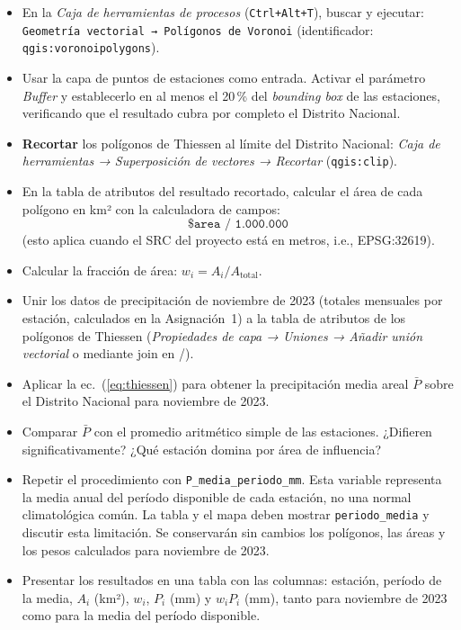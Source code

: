 \documentclass[11pt]{article}
\begin{document}
\begin{itemize}
  \item En la \emph{Caja de herramientas de procesos} (\texttt{Ctrl+Alt+T}),
    buscar y ejecutar:
    \texttt{Geometría vectorial → Polígonos de Voronoi}
    (identificador: \texttt{qgis:voronoipolygons}).

  \item Usar la capa de puntos de estaciones como entrada.
    Activar el parámetro \emph{Buffer} y establecerlo en al menos el
    20\,\% del \emph{bounding box} de las estaciones, verificando que el resultado
    cubra por completo el Distrito Nacional.

  \item \textbf{Recortar} los polígonos de Thiessen al límite del Distrito
    Nacional: \emph{Caja de herramientas → Superposición de vectores →
    Recortar} (\texttt{qgis:clip}).

  \item En la tabla de atributos del resultado recortado, calcular el área
    de cada polígono en km² con la calculadora de campos:
    \[
      \texttt{\$area / 1.000.000}
    \]
    (esto aplica cuando el SRC del proyecto está en metros, i.e., EPSG:32619).

  \item Calcular la fracción de área: $w_i = A_i / A_{\text{total}}$.
\end{itemize}


\begin{itemize}
  \item Unir los datos de precipitación de noviembre de 2023
    (totales mensuales por estación, calculados en la Asignación~1)
    a la tabla de atributos de los polígonos de Thiessen
    (\emph{Propiedades de capa → Uniones → Añadir unión vectorial}
    o mediante join en \python{}/\excel{}).

  \item Aplicar la ec.~(\ref{eq:thiessen}) para obtener la precipitación
    media areal $\bar{P}$ sobre el Distrito Nacional para noviembre de 2023.

  \item Comparar $\bar{P}$ con el promedio aritmético simple de las estaciones.
    ¿Difieren significativamente?  ¿Qué estación domina por área de influencia?

  \item Repetir el procedimiento con \texttt{P\_media\_periodo\_mm}. Esta
    variable representa la media anual del período disponible de cada estación,
    no una normal climatológica común. La tabla y el mapa deben mostrar
    \texttt{periodo\_media} y discutir esta limitación. Se conservarán sin
    cambios los polígonos, las áreas y los pesos calculados para noviembre de 2023.

  \item Presentar los resultados en una tabla con las columnas:
    estación, período de la media, $A_i$ (km²), $w_i$, $P_i$ (mm) y
    $w_i P_i$ (mm), tanto para noviembre de 2023 como para la media del
    período disponible.
\end{itemize}
\end{document}

